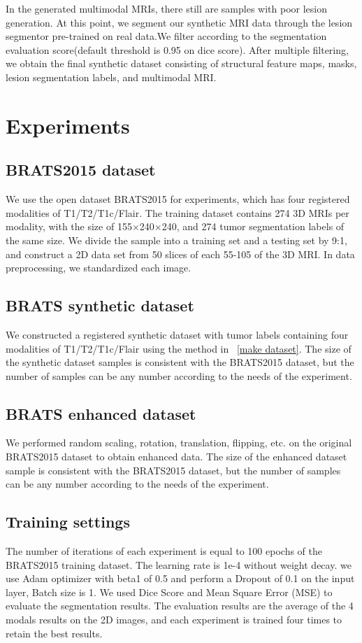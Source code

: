 \documentclass[letterpaper]{article} %
\begin{document}
In the generated multimodal MRIs, there still are samples with poor lesion generation. At this point, we segment our synthetic MRI data through the lesion segmentor pre-trained on real data.We filter according to the segmentation evaluation score(default threshold is 0.95 on dice score). After multiple filtering, we obtain the final synthetic dataset consisting of structural feature maps, masks,  lesion segmentation labels, and multimodal MRI.

\section{Experiments}

\subsection{BRATS2015 dataset}
We use the open dataset BRATS2015\cite{91menze:hal-00935640} for experiments, which has four registered modalities of T1/T2/T1c/Flair. The training dataset contains 274 3D MRIs per modality, with the size of 155$\times$240$\times$240, and 274 tumor segmentation labels of the same size. We divide the sample into a training set and a testing set by 9:1, and construct a 2D data set from 50 slices of each 55-105 of the 3D MRI. In data preprocessing, we standardized each image.

\subsection{BRATS synthetic dataset}
We constructed a registered synthetic dataset with tumor labels containing four modalities of T1/T2/T1c/Flair using the method in ~\ref{make dataset}. The size of the synthetic dataset samples is consistent with the BRATS2015 dataset, but the number of samples can be any number according to the needs of the experiment.

\subsection{BRATS enhanced dataset}
We performed random scaling, rotation, translation, flipping, etc. on the original BRATS2015 dataset to obtain enhanced data. The size of the enhanced dataset sample is consistent with the BRATS2015 dataset, but the number of samples can be any number according to the needs of the experiment.

\subsection{Training settings}
The number of iterations of each experiment is equal to 100 epochs of the BRATS2015 training dataset. The learning rate is 1e-4 without weight decay.  we use Adam optimizer with beta1 of 0.5 and perform a Dropout of 0.1 on the input layer, Batch size is 1. We used Dice Score \cite{95dice1945measures} and Mean Square Error (MSE)\cite{94prasad1990the} to evaluate the segmentation results. The evaluation results are the average of the 4 modals results on the 2D images, and each experiment is trained four times to retain the best results.
\end{document}
